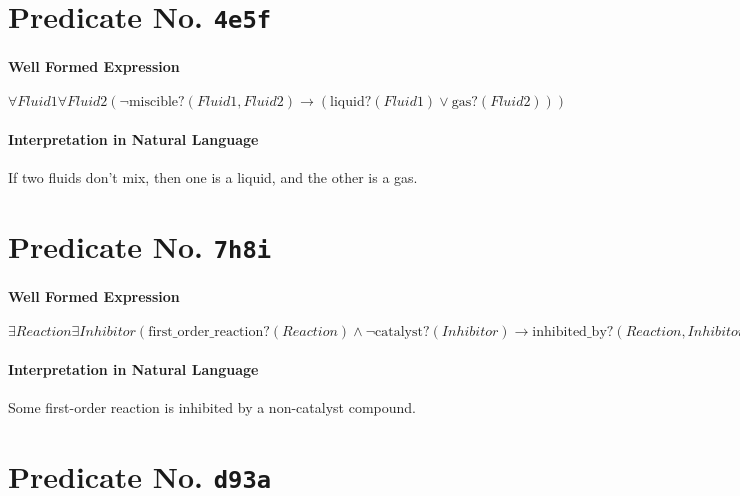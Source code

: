 \documentclass[11pt]{article}
\begin{document}
\section{Predicate No. \texttt{4e5f}}
\label{sec:orgeb06b1c}

\paragraph*{Well Formed Expression}
\label{sec:org0530c50}

\(\forall \mathit{Fluid1} \forall \mathit{Fluid2} (\neg \mathrm{miscible?}(\mathit{Fluid1}, \mathit{Fluid2}) \rightarrow (\mathrm{liquid?}(\mathit{Fluid1}) \lor \mathrm{gas?}(\mathit{Fluid2})))\)

\paragraph*{Interpretation in Natural Language}
\label{sec:org55ce793}

If two fluids don't mix, then one is a liquid, and the other is a gas.



\section{Predicate No. \texttt{7h8i}}
\label{sec:org958200f}

\paragraph*{Well Formed Expression}
\label{sec:orgc0b3088}

\(\exists \mathit{Reaction} \exists \mathit{Inhibitor} (\mathrm{first\_order\_reaction?}(\mathit{Reaction}) \land \neg \mathrm{catalyst?}(\mathit{Inhibitor}) \rightarrow \mathrm{inhibited\_by?}(\mathit{Reaction}, \mathit{Inhibitor}))\)

\paragraph*{Interpretation in Natural Language}
\label{sec:org79aa544}

Some first-order reaction is inhibited by a non-catalyst compound.



\section{Predicate No. \texttt{d93a}}
\label{sec:org93fc8fa}
\end{document}
